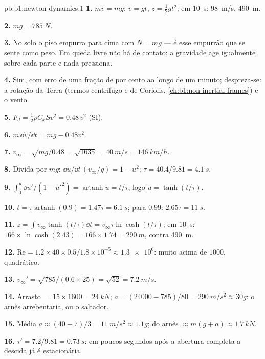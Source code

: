\begin{solution}{pb:b1:newton-dynamics:1}
\textbf{1.} $m\dot v = mg$: $v = gt$, $z = \tfrac12 gt^2$; em \qty{10}{s}:
\qty{98}{m/s}, \qty{490}{m}.

\textbf{2.} $mg = \qty{785}{N}$.

\textbf{3.} No solo o piso empurra para cima com $N = mg$ --- é esse empurrão
que se sente como peso. Em queda livre não há  de contato:
a gravidade age igualmente sobre cada parte e nada pressiona.

\textbf{4.} Sim, com erro de uma fração de por cento ao longo de um minuto; despreza-se:
a rotação da Terra (termos centrífugo e de Coriolis,
\cref{ch:b1:non-inertial-frames}) e o vento.

\textbf{5.} $F_d = \tfrac12\rho C_xSv^2 = 0.48\,v^2$ (SI).

\textbf{6.} $m\,\dd v/\dd t = mg - 0.48v^2$.

\textbf{7.} $v_\infty = \sqrt{mg/0.48} = \sqrt{1635} = \qty{40}{m/s} =
\qty{146}{km/h}$.

\textbf{8.} Divida por $mg$: $\dd u/\dd t\,(v_\infty/g) = 1 - u^2$;
$\tau = 40.4/9.81 = \qty{4.1}{s}$.

\textbf{9.} $\int_0^u\dd u'/(1 - u'^2) = \operatorname{artanh}u = t/\tau$,
logo $u = \tanh(t/\tau)$.

\textbf{10.} $t = \tau\operatorname{artanh}(0.9) = 1.47\tau = \qty{6.1}{s}$;
para $0.99$: $2.65\tau = \qty{11}{s}$.

\textbf{11.} $z = \int v_\infty\tanh(t/\tau)\dd t = v_\infty\tau\ln\cosh(t/\tau)$;
em \qty{10}{s}: $166 \times \ln\cosh(2.43) = 166 \times 1.74 = \qty{290}{m}$,
contra \qty{490}{m}.

\textbf{12.} $\mathrm{Re} = 1.2 \times 40 \times 0.5/1.8\times10^{-5} \approx
\num{1.3e6}$: muito acima de $1000$, quadrático.

\textbf{13.} $v_\infty' = \sqrt{785/(0.6 \times 25)} = \sqrt{52} = \qty{7.2}{m/s}$.

\textbf{14.} Arrasto $= 15 \times 1600 = \qty{24}{kN}$; $a = (24000 - 785)/80
= \qty{290}{m/s^2} \approx 30g$: o arnês arrebentaria, ou o saltador.

\textbf{15.} Média $a \approx (40 - 7)/3 = \qty{11}{m/s^2} \approx 1.1g$;
 do arnês $\approx m(g + a) \approx \qty{1.7}{kN}$.

\textbf{16.} $\tau' = 7.2/9.81 = \qty{0.73}{s}$: em poucos segundos após a
abertura completa a descida já é estacionária.


\end{solution}
